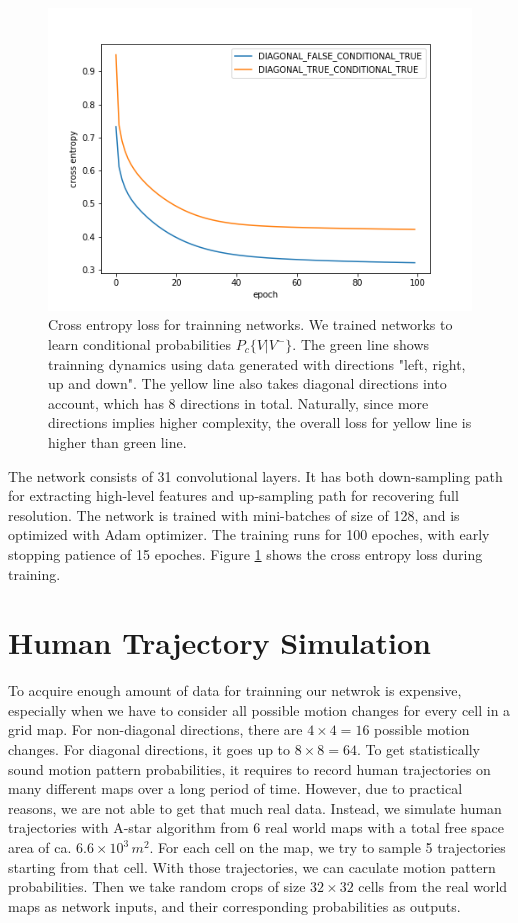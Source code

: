 \begin{figure}[ht]
  \centering
    \includegraphics[width=.7\textwidth]{figures/trainning_history.png}
    \caption{Cross entropy loss for trainning networks. We trained networks to learn conditional probabilities \( P_c\{V | V^-\} \). The green line shows trainning dynamics using data generated with directions "left, right, up and down". The yellow line also takes diagonal directions into account, which has 8 directions in total. Naturally, since more directions implies higher complexity, the overall loss for yellow line is higher than green line.}
    \label{fig:trainning}
\end{figure}

The network consists of 31 convolutional layers. It has both down-sampling path for extracting high-level features and up-sampling path for recovering full resolution. The network is trained with mini-batches of size of 128, and  is optimized with Adam optimizer. The training runs for 100 epoches, with early stopping patience of 15 epoches. Figure \ref{fig:trainning} shows the cross entropy loss during training.

\section{Human Trajectory Simulation} \label{section:hms}

To acquire enough amount of data for trainning our netwrok is expensive, especially when we have to consider all possible motion changes for every cell in a grid map. For non-diagonal directions, there are \( 4\times4=16\) possible motion changes. For diagonal directions, it goes up to \( 8\times8=64\). To get statistically sound motion pattern probabilities, it requires to record human trajectories on many different maps over a long period of time. However, due to practical reasons, we are not able to get that much real data. Instead, we simulate human trajectories with A-star algorithm from 6 real world maps with a total free space area of ca. \( 6.6\times10^3 \, m^2 \). For each cell on the map, we try to sample 5 trajectories starting from that cell. With those trajectories, we can caculate motion pattern probabilities. Then we take random crops of size \( 32 \times 32 \) cells from the real world maps as network inputs, and their corresponding probabilities as outputs. 

